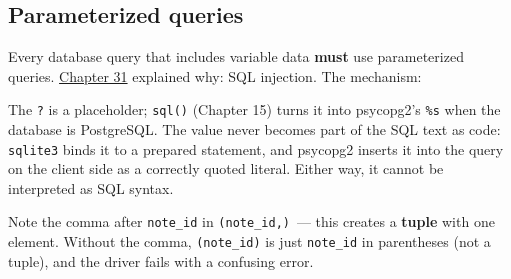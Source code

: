 \subsection*{Parameterized queries}\label{33-logic-execution:parameterized-queries}

Every database query that includes variable data \textbf{must} use parameterized queries. \hyperref[ch:31-input-handling]{Chapter 31} explained why: SQL injection. The mechanism:

\begin{codebox}[short]

\begin{Shaded}
\begin{Highlighting}[]
\SpecialCharTok{\{}\SpecialCharTok{\}}\NormalTok{)}

\end{Highlighting}
\end{Shaded}

\end{codebox}

\noindent{}The \texttt{?} is a placeholder; \texttt{sql()} (Chapter 15) turns it into psycopg2's \texttt{\%s} when the database is PostgreSQL. The value never becomes part of the SQL text as code: \texttt{sqlite3} binds it to a prepared statement, and psycopg2 inserts it into the query on the client side as a correctly quoted literal. Either way, it cannot be interpreted as SQL syntax.

Note the comma after \texttt{note\_id} in \texttt{(note\_id,)}~--- this creates a \textbf{tuple} with one element. Without the comma, \texttt{(note\_id)} is just \texttt{note\_id} in parentheses (not a tuple), and the driver fails with a confusing error.

\begin{codebox}[short]

\begin{Shaded}
\begin{Highlighting}[]

\NormalTok{), [note\_id])   }
\end{Highlighting}
\end{Shaded}

\end{codebox}

